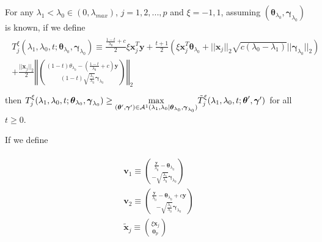 \begin{theorem}
    \label{thm:2.3}
    For any $\lambda_1<\lambda_{0}\in (0,\lambda_{max})$, $j=1,2,...,p$ and $\xi=-1,1$, assuming $(\boldsymbol\theta_{\lambda_0},\boldsymbol\gamma_{\lambda_0})$ is known, if we define
    \begin{gather}
        \begin{aligned}
            T^\xi_j(\lambda_1,\lambda_0,t;\boldsymbol\theta_{\lambda_0},\boldsymbol\gamma_{\lambda_0})\equiv\frac{\frac{1-t}{\lambda_0}+c}{2}\xi\boldsymbol x_j^T \boldsymbol y+\frac{t+1}{2}\left(\xi \boldsymbol x_j^T \boldsymbol \theta_{\lambda_0}+||\boldsymbol x_j||_2\sqrt{c(\lambda_0-\lambda_1)}||\boldsymbol\gamma_{\lambda_0}||_2\right)\\+\frac{||\boldsymbol x_j||_2}{2}\left\Vert\binom{(1-t)\theta_{\lambda_0}-\left(\frac{1-t}{\lambda_0}+c\right)\boldsymbol y}{(1-t)\sqrt{\frac{\lambda_1}{\lambda_0}}\boldsymbol\gamma_{\lambda_0}}\right\Vert_2\\
        \end{aligned}
    \end{gather}
    then $T^\xi_j(\lambda_1,\lambda_0,t;\boldsymbol\theta_{\lambda_0},\boldsymbol\gamma_{\lambda_0})\geq\underset{(\boldsymbol\theta',\boldsymbol\gamma')\in\mathcal{A}^1(\lambda_1,\lambda_0|\boldsymbol\theta_{\lambda_0},\boldsymbol\gamma_{\lambda_0})}{\mathrm{max}}\Tilde{T}^\xi_j(\lambda_1,\lambda_0,t;\boldsymbol\theta',\boldsymbol\gamma')$ for all $t\geq0$.
\end{theorem}

If we define

\begin{gather}
    \begin{aligned}
        \boldsymbol v_1\equiv\binom{\frac{\boldsymbol y}{\lambda_0}-\boldsymbol\theta_{\lambda_0}}{-\sqrt{\frac{\lambda_1}{\lambda_0}}\boldsymbol\gamma_{\lambda_0}}\\
        \boldsymbol v_2\equiv\binom{\frac{\boldsymbol y}{\lambda_0}-\boldsymbol\theta_{\lambda_0}+c\boldsymbol y}{-\sqrt{\frac{\lambda_1}{\lambda_0}}\boldsymbol\gamma_{\lambda_0}}\\
        \tilde{\boldsymbol x}_j\equiv\binom{\xi\boldsymbol x_j}{\boldsymbol 0_p}
    \end{aligned}
\end{gather}

